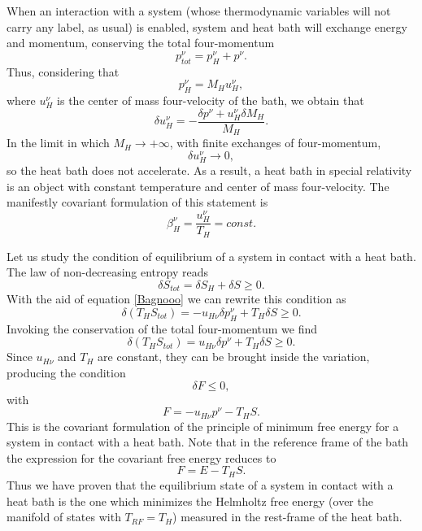 \documentclass[twocolumn,usenatbib]{mnras2}
\begin{document}
When an interaction with a system (whose thermodynamic variables will not carry any label, as usual) is enabled, system and heat bath will exchange energy and momentum, conserving the total four-momentum
\begin{equation}\label{quattromome}
p_{tot}^\nu = p_H^\nu +p^\nu.
\end{equation}
Thus, considering that 
\begin{equation}
p_H^\nu = M_H u_H^\nu,
\end{equation}
where $u_H^\nu$ is the center of mass four-velocity of the bath, we obtain that
\begin{equation}
\delta u_H^\nu = - \dfrac{\delta p^\nu +u_H^\nu \delta M_H}{M_H}.
\end{equation} 
In the limit in which $M_H \longrightarrow +\infty$, with finite exchanges of four-momentum, 
\begin{equation}
\delta u_H^\nu \longrightarrow 0,
\end{equation}
so the heat bath does not accelerate. As a result, a heat bath in special relativity is an object with constant temperature and center of mass four-velocity. The manifestly covariant formulation of this statement is
\begin{equation}
\beta_H^\nu = \dfrac{u_H^\nu}{T_H} = const.
\end{equation} 

Let us study the condition of equilibrium of a system in contact with a heat bath. The law of non-decreasing entropy reads
\begin{equation}
\delta S_{tot} = \delta S_H + \delta S \geq 0.
\end{equation}
With the aid of equation \eqref{Bagnooo} we can rewrite this condition as
\begin{equation}
\delta (T_H S_{tot}) = -u_{H\nu} \delta p_H^\nu + T_H \delta S \geq 0.
\end{equation}
Invoking the conservation of the total four-momentum we find
\begin{equation}
\delta (T_H S_{tot}) = u_{H\nu} \delta p^\nu + T_H \delta S \geq 0.
\end{equation}
Since $u_{H\nu}$ and $T_H$ are constant, they can be brought inside the variation, producing the condition
\begin{equation}\label{nonincreasing}
\delta F \leq 0,
\end{equation}
with
\begin{equation}\label{freeenergy}
F = -u_{H\nu}p^\nu -T_H S.
\end{equation}
This is the covariant formulation of the principle of minimum free energy for a system in contact with a heat bath. Note that in the reference frame of the bath the expression for the covariant free energy reduces to
\begin{equation}
F = E -T_H S.
\end{equation}
Thus we have proven that the equilibrium state of a system in contact with a heat bath is the one which minimizes the Helmholtz free energy (over the manifold of states with $T_{RF}=T_H$) measured in the rest-frame of the heat bath.
\end{document}
